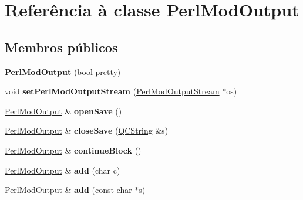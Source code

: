 \hypertarget{class_perl_mod_output}{\section{Referência à classe Perl\-Mod\-Output}
\label{class_perl_mod_output}
}
\subsection*{Membros públicos}
\begin{DoxyCompactItemize}
\item 
\hypertarget{class_perl_mod_output_ad7c4f5616d30e2273c27ee02a90d2026}{{\bfseries Perl\-Mod\-Output} (bool pretty)}\label{class_perl_mod_output_ad7c4f5616d30e2273c27ee02a90d2026}

\item 
\hypertarget{class_perl_mod_output_a59bfb3ad07f5d1a62d0b6ab7e5e7f23c}{void {\bfseries set\-Perl\-Mod\-Output\-Stream} (\hyperlink{class_perl_mod_output_stream}{Perl\-Mod\-Output\-Stream} $\ast$os)}\label{class_perl_mod_output_a59bfb3ad07f5d1a62d0b6ab7e5e7f23c}

\item 
\hypertarget{class_perl_mod_output_ae7d910bd434044eda4995a491e3ccbff}{\hyperlink{class_perl_mod_output}{Perl\-Mod\-Output} \& {\bfseries open\-Save} ()}\label{class_perl_mod_output_ae7d910bd434044eda4995a491e3ccbff}

\item 
\hypertarget{class_perl_mod_output_a063d342293f1198f5fa4dab1807511f7}{\hyperlink{class_perl_mod_output}{Perl\-Mod\-Output} \& {\bfseries close\-Save} (\hyperlink{class_q_c_string}{Q\-C\-String} \&s)}\label{class_perl_mod_output_a063d342293f1198f5fa4dab1807511f7}

\item 
\hypertarget{class_perl_mod_output_a1686b7f72f4500beb9d58a0d3e7e40df}{\hyperlink{class_perl_mod_output}{Perl\-Mod\-Output} \& {\bfseries continue\-Block} ()}\label{class_perl_mod_output_a1686b7f72f4500beb9d58a0d3e7e40df}

\item 
\hypertarget{class_perl_mod_output_a3fc85c15dba8c48b7561930e0cf0fa0b}{\hyperlink{class_perl_mod_output}{Perl\-Mod\-Output} \& {\bfseries add} (char c)}\label{class_perl_mod_output_a3fc85c15dba8c48b7561930e0cf0fa0b}

\item 
\hypertarget{class_perl_mod_output_a79cb25dfd2cc3d95e6d23331ff225218}{\hyperlink{class_perl_mod_output}{Perl\-Mod\-Output} \& {\bfseries add} (const char $\ast$s)}\label{class_perl_mod_output_a79cb25dfd2cc3d95e6d23331ff225218}


\end{DoxyCompactItemize}
